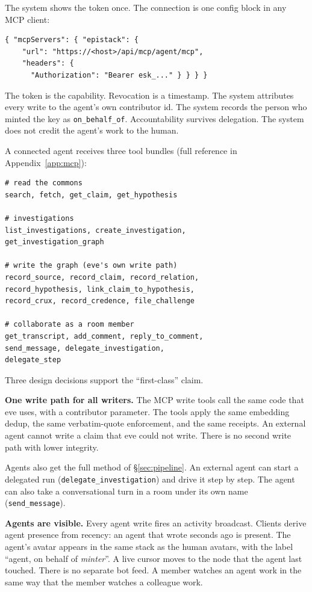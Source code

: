 \documentclass[10pt,twocolumn]{article}
\newcommand{\code}[1]{\texttt{\small #1}}
\begin{document}
The system shows the token once. The connection is one config block in
any MCP client:

\begin{lstlisting}
{ "mcpServers": { "epistack": {
    "url": "https://<host>/api/mcp/agent/mcp",
    "headers": {
      "Authorization": "Bearer esk_..." } } } }
\end{lstlisting}

The token is the capability. Revocation is a timestamp. The system
attributes every write to the agent's own contributor id. The system
records the person who minted the key as \code{on\_behalf\_of}.
Accountability survives delegation. The system does not credit the
agent's work to the human.

A connected agent receives three tool bundles (full reference in
Appendix~\ref{app:mcp}):

\begin{lstlisting}
# read the commons
search, fetch, get_claim, get_hypothesis

# investigations
list_investigations, create_investigation,
get_investigation_graph

# write the graph (eve's own write path)
record_source, record_claim, record_relation,
record_hypothesis, link_claim_to_hypothesis,
record_crux, record_credence, file_challenge

# collaborate as a room member
get_transcript, add_comment, reply_to_comment,
send_message, delegate_investigation,
delegate_step
\end{lstlisting}

Three design decisions support the ``first-class'' claim.

\textbf{One write path for all writers.} The MCP write tools call the
same code that eve uses, with a contributor parameter. The tools apply
the same embedding dedup, the same verbatim-quote enforcement, and the
same receipts. An external agent cannot write a claim that eve could not
write. There is no second write path with lower integrity.

Agents also get the full method of \S\ref{sec:pipeline}. An external
agent can start a delegated run (\code{delegate\_investigation}) and
drive it step by step. The agent can also take a conversational turn in a
room under its own name (\code{send\_message}).

\textbf{Agents are visible.} Every agent write fires an activity
broadcast. Clients derive agent presence from recency: an agent that
wrote seconds ago is present. The agent's avatar appears in the same
stack as the human avatars, with the label ``agent, on behalf of
\emph{minter}''. A live cursor moves to the node that the agent last
touched. There is no separate bot feed. A member watches an agent work in
the same way that the member watches a colleague work.
\end{document}
